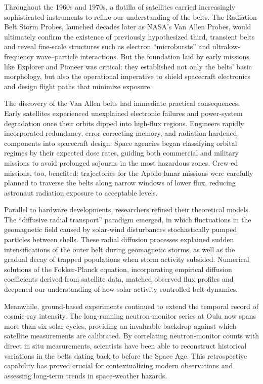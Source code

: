 \documentclass[12pt]{report}
\begin{document}
Throughout the 1960s and 1970s, a flotilla of satellites carried increasingly sophisticated instruments to refine our understanding of the belts.  The Radiation Belt Storm Probes, launched decades later as NASA’s Van Allen Probes, would ultimately confirm the existence of previously hypothesized third, transient belts and reveal fine‐scale structures such as electron “microbursts” and ultralow‐frequency wave–particle interactions.  But the foundation laid by early missions like Explorer and Pioneer was critical: they established not only the belts’ basic morphology, but also the operational imperative to shield spacecraft electronics and design flight paths that minimize exposure.

The discovery of the Van Allen belts had immediate practical consequences.  Early satellites experienced unexplained electronic failures and power‐system degradation once their orbits dipped into high‐flux regions.  Engineers rapidly incorporated redundancy, error‐correcting memory, and radiation‐hardened components into spacecraft design.  Space agencies began classifying orbital regimes by their expected dose rates, guiding both commercial and military missions to avoid prolonged sojourns in the most hazardous zones.  Crew‐ed missions, too, benefited: trajectories for the Apollo lunar missions were carefully planned to traverse the belts along narrow windows of lower flux, reducing astronaut radiation exposure to acceptable levels.

Parallel to hardware developments, researchers refined their theoretical models.  The “diffusive radial transport” paradigm emerged, in which fluctuations in the geomagnetic field caused by solar‐wind disturbances stochastically pumped particles between shells.  These radial diffusion processes explained sudden intensifications of the outer belt during geomagnetic storms, as well as the gradual decay of trapped populations when storm activity subsided.  Numerical solutions of the Fokker‐Planck equation, incorporating empirical diffusion coefficients derived from satellite data, matched observed flux profiles and deepened our understanding of how solar activity controlled belt dynamics.

Meanwhile, ground‐based experiments continued to extend the temporal record of cosmic‐ray intensity.  The long‐running neutron‐monitor series at Oulu now spans more than six solar cycles, providing an invaluable backdrop against which satellite measurements are calibrated.  By correlating neutron‐monitor counts with direct in situ measurements, scientists have been able to reconstruct historical variations in the belts dating back to before the Space Age.  This retrospective capability has proved crucial for contextualizing modern observations and assessing long‐term trends in space‐weather hazards.
\end{document}
